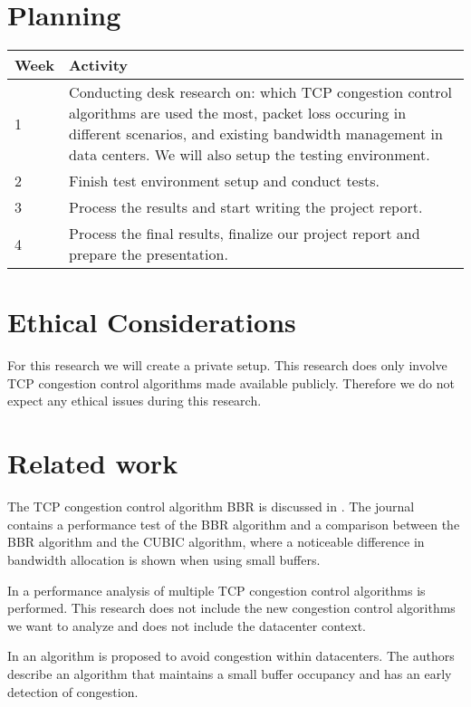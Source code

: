 \documentclass{article}
\begin{document}
\section{Planning}

\begin{tabular}[H]{ | l | p{10.2cm} | }
	\hline
	\textbf{Week} & \textbf{Activity} \\
	\hline 1 & Conducting desk research on: which TCP congestion control algorithms are used the most, packet loss occuring in different scenarios, and existing bandwidth management in data centers. We will also setup the testing environment. \\
	\hline 2 & Finish test environment setup and conduct tests. \\
	\hline 3 & Process the results and start writing the project report. \\
	\hline 4 & Process the final results, finalize our project report and prepare the presentation. \\
	\hline
\end{tabular}


\section{Ethical Considerations}

For this research we will create a private setup. This research does only
involve TCP congestion control algorithms made available publicly. Therefore we
do not expect any ethical issues during this research.


\section{Related work}

The TCP congestion control algorithm BBR is discussed in \cite{bbr-congestion}.
The journal contains a performance test of the BBR algorithm and a comparison
between the BBR algorithm and the CUBIC algorithm, where a noticeable
difference in bandwidth allocation is shown when using small buffers.

In \cite{multiple-congestion} a performance analysis of multiple TCP congestion
control algorithms is performed. This research does not include the new
congestion control algorithms we want to analyze and does not include the
datacenter context.

In \cite{dctcp-congestion-original} an algorithm is proposed to avoid
congestion within datacenters. The authors describe an algorithm that maintains
a small buffer occupancy and has an early detection of congestion.

\printbibliography
\end{document}

